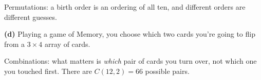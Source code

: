 \documentclass[12pt]{ximera}
\begin{document}
\begin{problem}
\begin{prompt}
\begin{multipleChoice}
\end{multipleChoice}

\begin{feedback}
Permutations: a birth order is an ordering of all ten, and different orders are
different guesses.
\end{feedback}
\end{prompt}

\begin{prompt}
\textbf{(d)} Playing a game of Memory, you choose which two cards you're going to flip
from a $3\times 4$ array of cards.

\begin{multipleChoice}
\end{multipleChoice}

\begin{feedback}
Combinations: what matters is \emph{which} pair of cards you turn over, not which one
you touched first. There are $C(12,2)=66$ possible pairs.
\end{feedback}
\end{prompt}
\end{problem}
\end{document}
